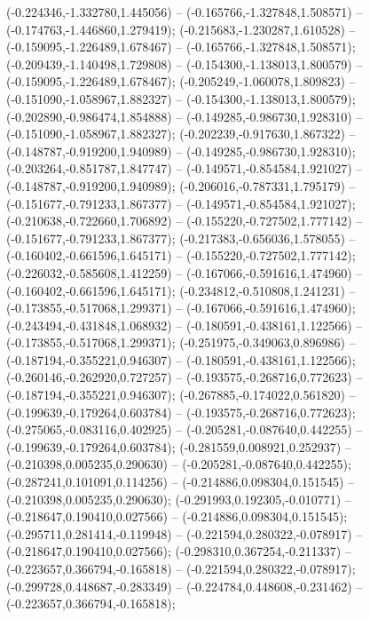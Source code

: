  (-0.224346,-1.332780,1.445056) -- (-0.165766,-1.327848,1.508571) -- (-0.174763,-1.446860,1.279419);
 (-0.215683,-1.230287,1.610528) -- (-0.159095,-1.226489,1.678467) -- (-0.165766,-1.327848,1.508571);
 (-0.209439,-1.140498,1.729808) -- (-0.154300,-1.138013,1.800579) -- (-0.159095,-1.226489,1.678467);
 (-0.205249,-1.060078,1.809823) -- (-0.151090,-1.058967,1.882327) -- (-0.154300,-1.138013,1.800579);
 (-0.202890,-0.986474,1.854888) -- (-0.149285,-0.986730,1.928310) -- (-0.151090,-1.058967,1.882327);
 (-0.202239,-0.917630,1.867322) -- (-0.148787,-0.919200,1.940989) -- (-0.149285,-0.986730,1.928310);
 (-0.203264,-0.851787,1.847747) -- (-0.149571,-0.854584,1.921027) -- (-0.148787,-0.919200,1.940989);
 (-0.206016,-0.787331,1.795179) -- (-0.151677,-0.791233,1.867377) -- (-0.149571,-0.854584,1.921027);
 (-0.210638,-0.722660,1.706892) -- (-0.155220,-0.727502,1.777142) -- (-0.151677,-0.791233,1.867377);
 (-0.217383,-0.656036,1.578055) -- (-0.160402,-0.661596,1.645171) -- (-0.155220,-0.727502,1.777142);
 (-0.226032,-0.585608,1.412259) -- (-0.167066,-0.591616,1.474960) -- (-0.160402,-0.661596,1.645171);
 (-0.234812,-0.510808,1.241231) -- (-0.173855,-0.517068,1.299371) -- (-0.167066,-0.591616,1.474960);
 (-0.243494,-0.431848,1.068932) -- (-0.180591,-0.438161,1.122566) -- (-0.173855,-0.517068,1.299371);
 (-0.251975,-0.349063,0.896986) -- (-0.187194,-0.355221,0.946307) -- (-0.180591,-0.438161,1.122566);
 (-0.260146,-0.262920,0.727257) -- (-0.193575,-0.268716,0.772623) -- (-0.187194,-0.355221,0.946307);
 (-0.267885,-0.174022,0.561820) -- (-0.199639,-0.179264,0.603784) -- (-0.193575,-0.268716,0.772623);
 (-0.275065,-0.083116,0.402925) -- (-0.205281,-0.087640,0.442255) -- (-0.199639,-0.179264,0.603784);
 (-0.281559,0.008921,0.252937) -- (-0.210398,0.005235,0.290630) -- (-0.205281,-0.087640,0.442255);
 (-0.287241,0.101091,0.114256) -- (-0.214886,0.098304,0.151545) -- (-0.210398,0.005235,0.290630);
 (-0.291993,0.192305,-0.010771) -- (-0.218647,0.190410,0.027566) -- (-0.214886,0.098304,0.151545);
 (-0.295711,0.281414,-0.119948) -- (-0.221594,0.280322,-0.078917) -- (-0.218647,0.190410,0.027566);
 (-0.298310,0.367254,-0.211337) -- (-0.223657,0.366794,-0.165818) -- (-0.221594,0.280322,-0.078917);
 (-0.299728,0.448687,-0.283349) -- (-0.224784,0.448608,-0.231462) -- (-0.223657,0.366794,-0.165818);
